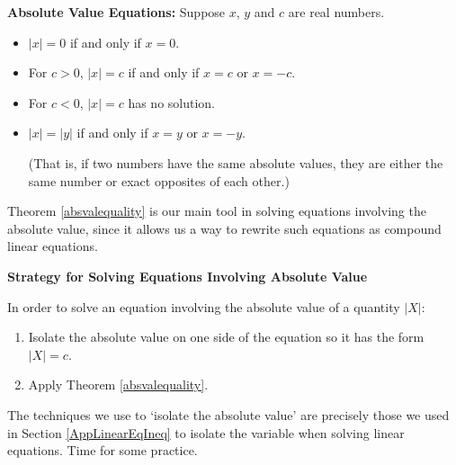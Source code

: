\documentclass{ximera}
\begin{document}
\begin{theorem} \textbf{Absolute Value Equations: }\label{absvalequality}  Suppose $x$, $y$ and $c$ are real numbers.

\begin{itemize}

\item  $|x| = 0$ if and only if $x = 0$.

\item  For $c > 0$, $|x| = c$ if and only if $x = c$ or $x = -c$.

\item  For $c < 0$, $|x| = c$ has no solution.

\item  $|x| = |y|$ if and only if $x = y$ or $x = -y$. 

(That is,  if two numbers have the same absolute values, they are either the same number or exact opposites of each other.) 

\end{itemize}

\end{theorem}


 

Theorem \ref{absvalequality} is our main tool in solving equations involving the absolute value, since it allows us a way to rewrite such equations as compound linear equations.

 

 
\label{strategyforsolvingabseqns}


\centerline{\textbf{Strategy for Solving Equations Involving Absolute Value}}



In order to solve an equation involving the absolute value of a quantity $|X|$:

\begin{enumerate}

\item  Isolate the absolute value on one side of the equation so it has the form $|X| = c$.

\item  Apply Theorem \ref{absvalequality}.

\end{enumerate}


 

The techniques we use to `isolate the absolute value' are precisely those we used in Section \ref{AppLinearEqIneq} to isolate the variable when solving linear equations.  Time for some practice.
\end{document}
